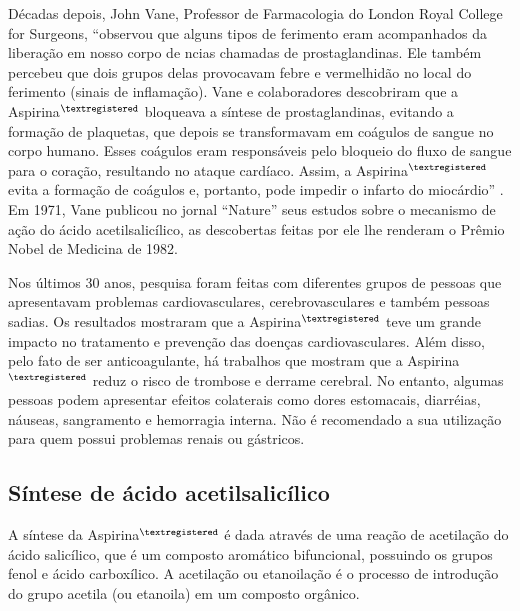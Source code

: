    Décadas depois, John Vane, Professor de Farmacologia do London Royal College for Surgeons, “observou que
    alguns tipos de ferimento eram acompanhados da liberação em nosso corpo de ncias chamadas de
    prostaglandinas. Ele também percebeu que dois grupos delas provocavam febre e vermelhidão no local do
    ferimento (sinais de inflamação). Vane e colaboradores descobriram que a
    Aspirina$^{\tiny{\textregistered}}$ bloqueava a síntese de prostaglandinas, evitando a formação de
    plaquetas, que depois se transformavam em coágulos de sangue no corpo humano. Esses coágulos eram
    responsáveis pelo bloqueio do fluxo de sangue para o coração, resultando no ataque cardíaco. Assim, a
    Aspirina$^{\tiny{\textregistered}}$ evita a formação de coágulos e, portanto, pode impedir o infarto do
    miocárdio” \cite{massabni2006}. Em 1971, Vane publicou no jornal “Nature” seus estudos sobre o mecanismo de
    ação do ácido acetilsalicílico, as descobertas feitas por ele lhe renderam o Prêmio Nobel de Medicina de
    1982. 

    Nos últimos 30 anos, pesquisa foram feitas com diferentes grupos de pessoas que apresentavam problemas
    cardiovasculares, cerebrovasculares e também pessoas sadias. Os resultados mostraram que a
    Aspirina$^{\tiny{\textregistered}}$ teve um grande impacto no tratamento e prevenção das doenças
    cardiovasculares.  Além disso, pelo fato de ser anticoagulante, há trabalhos que mostram que a
    Aspirina$^{\tiny{\textregistered}}$ reduz o risco de trombose e derrame cerebral. No entanto, algumas
    pessoas podem apresentar efeitos colaterais como dores estomacais, diarréias, náuseas, sangramento e
    hemorragia interna. Não é recomendado a sua utilização para quem possui problemas renais ou gástricos.

    \subsection{Síntese de ácido acetilsalicílico}

    A síntese da Aspirina$^{\tiny{\textregistered}}$ é dada através de uma reação de acetilação do ácido
    salicílico, que é um composto aromático bifuncional, possuindo os grupos fenol e ácido carboxílico. A
    acetilação ou etanoilação é o processo de introdução do grupo acetila (ou etanoila) em um composto
    orgânico.

